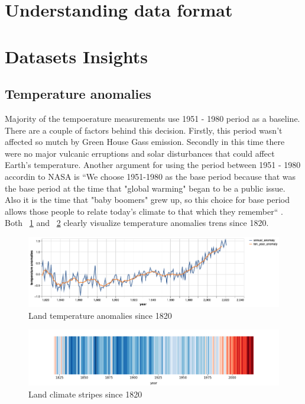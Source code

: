 \section{Understanding data format}

\section{Datasets Insights}

\subsection{Temperature anomalies}

Majority of the tempoerature measurements use 1951 - 1980 period as a baseline. There are a couple of factors behind this decision. Firstly, this period wasn't affected so mutch by Green House Gass emission. 
Secondly in this time there were no major vulcanic erruptions and solar disturbances that could affect Earth's temperature. Another argument for using the period between 1951 - 1980 accordin to NASA is
``We choose 1951-1980 as the base period because that was the base period at the time that "global warming" began to be a public issue. Also it is the time that "baby boomers" grew up, so this choice for base period allows those people to relate today's climate to that which they remember`` \cite{nasa-giss}.
Both ~\ref{fig:temperature_anomalies} and ~\ref{fig:climat_stripes} clearly visualize temperature anomalies trens since 1820.

\begin{figure}[h]
  \includegraphics[width=\linewidth]{img/temperature_anomalies.png}
  \caption{Land temperature anomalies since 1820}
  \label{fig:temperature_anomalies}
\end{figure}

\begin{figure}[h]
  \includegraphics[width=\linewidth]{img/climate_stripes.png}
  \caption{Land climate stripes since 1820}
  \label{fig:climat_stripes}
\end{figure}

